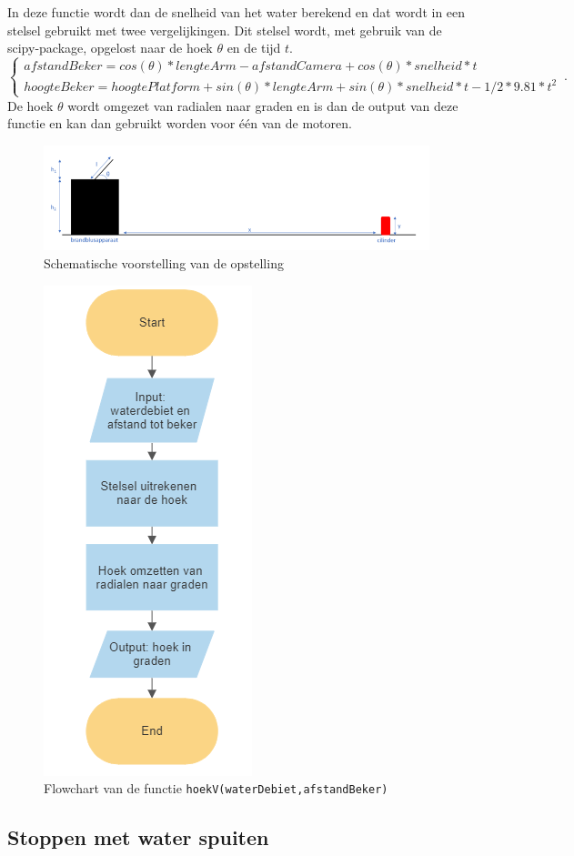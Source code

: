 \documentclass[kulak]{kulakarticle} %
\begin{document}
In deze functie wordt dan de snelheid van het water berekend en dat wordt in een stelsel gebruikt met twee vergelijkingen. Dit stelsel wordt, met gebruik van de scipy-package, opgelost naar de hoek \(\theta\) en de tijd \(t\).
\begin{equation}
	\begin{cases}
		afstandBeker  = cos(\theta )*lengteArm - afstandCamera + cos(\theta )*snelheid*t \\ 
		hoogteBeker  =  hoogtePlatform + sin(\theta )*lengteArm + sin(\theta )*snelheid*t - 1/2*9.81*t^2
	\end{cases}\,.
\end{equation}
De hoek \(\theta\) wordt omgezet van radialen naar graden en is dan de output van deze functie en kan dan gebruikt worden voor één van de motoren.

\begin{figure} [h!]
	\centering
	\includegraphics[width = 1 \textwidth]{schematische voorstelling water LATEX}
	\caption{Schematische voorstelling van de opstelling}
	\label{schematische voorstelling}
\end{figure}

\begin{figure} [h!]
	\centering
	\includegraphics[width = .2 \textwidth]{flowchart_hoekV}
\cprotect\caption{Flowchart van de functie \verb*|hoekV(waterDebiet,afstandBeker)|}
	\label{flowchart_water}
\end{figure}




\subsection{Stoppen met water spuiten}
\end{document}
